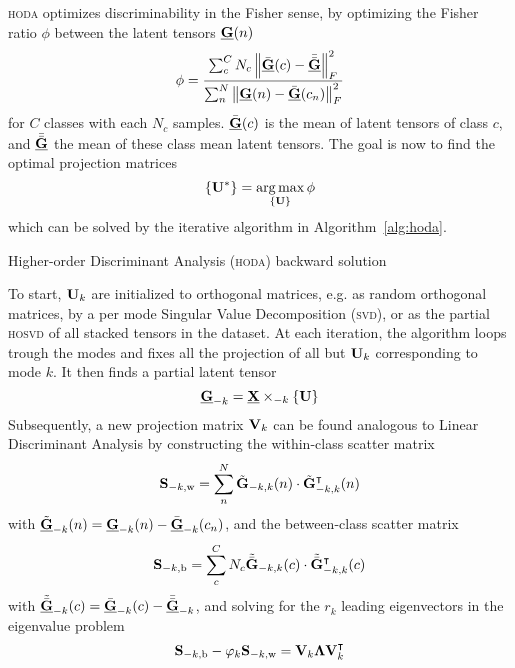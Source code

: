 \documentclass[twocolumn]{article}
\begin{document}
\textsc{hoda} optimizes discriminability in the Fisher sense, by optimizing the
Fisher ratio $\phi$ between the latent tensors $\ten{G}(n)$
\begin{equation}
  \phi = \frac{\sum_c^CN_c\left\lVert\bar{\ten{G}}(c)-\bar{\bar{\ten{G}}}\right\rVert_F^2}
	{\sum_n^N\left\lVert\ten{G}(n)-\bar{\ten{G}}(c_n)\right\rVert_F^2}
	\label{eq:fisher}
\end{equation}
for $C$ classes with each $N_c$ samples. $\bar{\ten{G}}(c)$ is the mean of
latent
tensors of class $c$, and $\bar{\bar{\ten{G}}}$ the mean of
these class mean latent tensors.
The goal is now to find the optimal projection matrices
\begin{equation}
  \left\{\mat{U}^*\right\} = \argmax_{\{\mat{U}\}}\phi
\end{equation}
which can be solved by the iterative algorithm in Algorithm~\ref{alg:hoda}.
\begin{algorithm}
  \caption{Higher-order Discriminant Analysis (\textsc{hoda}) backward solution}
  \label{alg:hoda}
  
\end{algorithm}
To start, $\mat{U}_k$ are initialized to orthogonal matrices, e.g. as random
orthogonal matrices, by a per mode Singular Value Decomposition (\textsc{svd}),
or as the partial \textsc{hosvd} of all stacked tensors in the dataset.
At each iteration, the algorithm loops trough the modes and fixes all the
projection of all but $\mat{U}_k$ corresponding to mode $k$.
It then finds a partial latent tensor
\begin{equation}
  \ten{G}_{-k}=\ten{X}\mmprs{\mat{U}}{k}
\end{equation}
Subsequently, a new projection matrix $\mat{V}_k$ can be found analogous to Linear
Discriminant Analysis by constructing the within-class scatter matrix
\begin{equation}
  \mat{S}_{-k,\text{w}} = \sum_n^N\tilde{\mat{G}}_{-k,k}(n)\cdot\tilde{\mat{G}}_{-k,k}^\intercal(n)
\end{equation}
with $\tilde{\ten{G}}_{-k}(n) = \ten{G}_{-k}(n) - \bar{\ten{G}}_{-k}(c_n)$,
and the between-class scatter matrix
\begin{equation}
  \mat{S}_{-k,\text{b}} =
  \sum_c^CN_c\tilde{\bar{\mat{G}}}_{-k,k}(c)\cdot\tilde{\bar{\mat{G}}}_{-k,k}^\intercal(c)
\end{equation}
with $\tilde{\bar{\ten{G}}}_{-k}(c) = \bar{\ten{G}}_{-k}(c) - \bar{\bar{\ten{G}}}_{-k}$,
and solving for the $r_k$ leading eigenvectors in the eigenvalue problem
\begin{equation}
   \mat{S}_{-k,\text{b}}-\varphi_k\mat{S}_{-k,\text{w}} =
   \mat{V}_k\mat{\Lambda}\mat{V}_k^\intercal
\end{equation}
\end{document}
